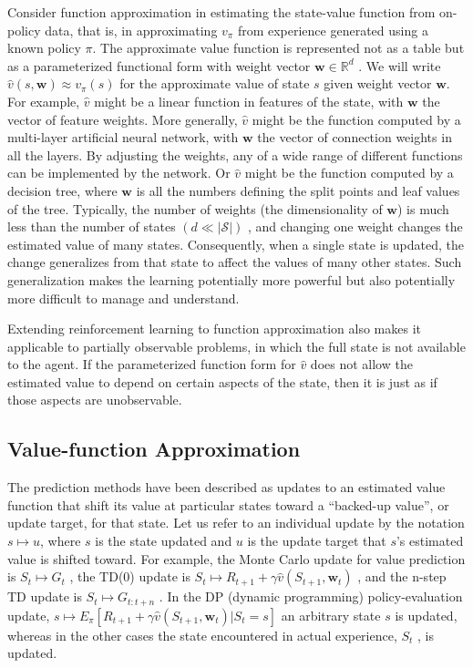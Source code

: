 \documentclass{article}
\begin{document}
Consider function approximation in estimating the state-value function from on-policy data, that is, in approximating $v _ { \pi }$ from experience generated using a known policy $\pi$. 
The approximate value function is represented not as a table but as a parameterized functional form with weight vector $\mathbf { w } \in \mathbb { R } ^ { d } $ . 
We will write $\hat { v } ( s \mathbf { , } \mathbf { w } ) \approx v _ { \pi } ( s )$ for the approximate value of state $s$ given weight vector $\mathbf { w }$. For example, $\hat { v }$ might be 
a linear function in features of the state, with $\mathbf { w }$ the vector of feature weights. More generally, $\hat { v }$ might be the function computed by a multi-layer artificial neural network, 
with $\mathbf { w }$ the vector of connection weights in all the layers. By adjusting the weights, any of a wide range of different functions can be implemented by the network. 
Or $\hat { v }$ might be the function computed by a decision tree, where $\mathbf { w }$ is all the numbers defining the split points and leaf values of the tree. 
Typically, the number of weights (the dimensionality of $\mathbf { w }$) is much less than the number of states $( d \ll | \mathcal { S } | )$ , and changing one weight 
changes the estimated value of many states. Consequently, when a single state is updated, the change generalizes from that state to affect the values of many other states. 
Such generalization makes the learning potentially more powerful but also potentially more difficult to manage and understand.

Extending reinforcement learning to function approximation also makes it applicable to partially observable problems, in which the full state is not available to the agent. 
If the parameterized function form for $\hat { v }$ does not allow the estimated value to depend on certain aspects of the state, then it is just as if those aspects are unobservable. 

\subsection{Value-function Approximation}

The prediction methods have been described as updates to an estimated value function that shift its value at particular states toward a “backed-up value”, 
or update target, for that state. Let us refer to an individual update by the notation $s \mapsto u$, where $s$ is the state updated and $u$ is the update target that $s$'s estimated value is shifted toward. 
For example, the Monte Carlo update for value prediction is $S _ { t } \mapsto G _ { t }$ , the TD(0) update is $S _ { t } \mapsto R _ { t + 1 } { + } \gamma \hat { v } ( S _ { t + 1 } { , } \mathbf { w } _ { t } )$ , 
and the n-step TD update is $S _ { t } \mapsto G _ { t : t + n }$ . In the DP (dynamic programming) policy-evaluation update, $s \mapsto E _ { \pi } [ R _ { t + 1 } + \gamma \hat { v } ( S _ { t + 1 } \mathbf { , } \mathbf { w } _ { t } ) | S _ { t } \mathbf { = } s ]$ 
an arbitrary state $s$ is updated, whereas in the other cases the state encountered in actual experience, $S _ { t }$ , is updated.
\end{document}
